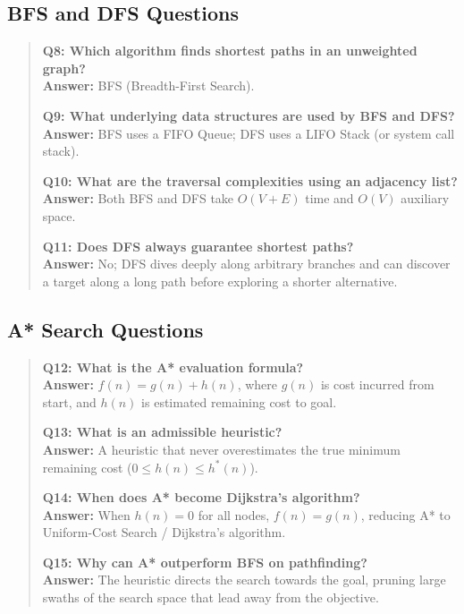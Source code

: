 \subsection{BFS and DFS Questions}
\begin{quote}
\textbf{Q8: Which algorithm finds shortest paths in an unweighted graph?}\\
\textbf{Answer:} BFS (Breadth-First Search).

\textbf{Q9: What underlying data structures are used by BFS and DFS?}\\
\textbf{Answer:} BFS uses a FIFO Queue; DFS uses a LIFO Stack (or system call stack).

\textbf{Q10: What are the traversal complexities using an adjacency list?}\\
\textbf{Answer:} Both BFS and DFS take $O(V + E)$ time and $O(V)$ auxiliary space.

\textbf{Q11: Does DFS always guarantee shortest paths?}\\
\textbf{Answer:} No; DFS dives deeply along arbitrary branches and can discover a target along a long path before exploring a shorter alternative.
\end{quote}

\subsection{A* Search Questions}
\begin{quote}
\textbf{Q12: What is the A* evaluation formula?}\\
\textbf{Answer:} $f(n) = g(n) + h(n)$, where $g(n)$ is cost incurred from start, and $h(n)$ is estimated remaining cost to goal.

\textbf{Q13: What is an admissible heuristic?}\\
\textbf{Answer:} A heuristic that never overestimates the true minimum remaining cost ($0 \leq h(n) \leq h^*(n)$).

\textbf{Q14: When does A* become Dijkstra's algorithm?}\\
\textbf{Answer:} When $h(n) = 0$ for all nodes, $f(n) = g(n)$, reducing A* to Uniform-Cost Search / Dijkstra's algorithm.

\textbf{Q15: Why can A* outperform BFS on pathfinding?}\\
\textbf{Answer:} The heuristic directs the search towards the goal, pruning large swaths of the search space that lead away from the objective.
\end{quote}

